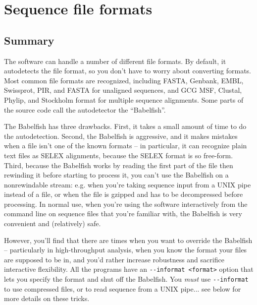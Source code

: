 
\chapter {Sequence file formats}

\section{Summary}

The software can handle a number of different file formats. By
default, it autodetects the file format, so you don't have to worry
about converting formats. Most common file formats are recognized,
including FASTA, Genbank, EMBL, Swissprot, PIR, and FASTA for
unaligned sequences, and GCG MSF, Clustal, Phylip, and Stockholm
format for multiple sequence alignments. Some parts of the source code
call the autodetector the ``Babelfish''. 

The Babelfish has three drawbacks. First, it takes a small amount of
time to do the autodetection. Second, the Babelfish is aggressive, and
it makes mistakes when a file isn't one of the known formats -- in
particular, it can recognize plain text files as SELEX alignments,
because the SELEX format is so free-form. Third, because the Babelfish
works by reading the first part of the file then rewinding it before
starting to process it, you can't use the Babelfish on a nonrewindable
stream: e.g. when you're taking sequence input from a UNIX pipe
instead of a file, or when the file is gzipped and has to be
decompressed before processing.  In normal use, when you're using the
software interactively from the command line on sequence files that
you're familiar with, the Babelfish is very convenient and
(relatively) safe.

However, you'll find that there are times when you want to override
the Babelfish -- particularly in high-throughput analysis, when you
know the format your files are supposed to be in, and you'd rather
increase robustness and sacrifice interactive flexibility. All the
programs have an \verb+--informat <format>+ option that lets you
specify the format and shut off the Babelfish. You \emph{must} use
\verb+--informat+ to use compressed files, or to read sequence from a
UNIX pipe... see below for more details on these tricks.

